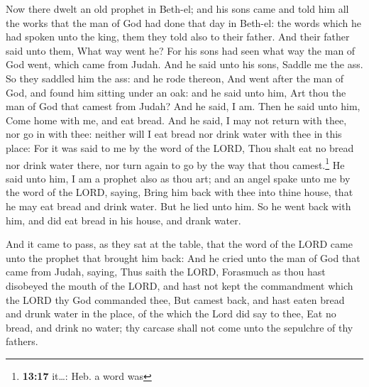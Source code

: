  Now there dwelt an old prophet in Beth-el; and his sons
came and told him all the works that the man of God had done that day in
Beth-el: the words which he had spoken unto the king, them they told
also to their father.  And their father said unto them,
What way went he? For his sons had seen what way the man of God went,
which came from Judah.  And he said unto his sons, Saddle
me the ass. So they saddled him the ass: and he rode thereon,
 And went after the man of God, and found him sitting
under an oak: and he said unto him, Art thou the man of God that camest
from Judah? And he said, I am.  Then he said unto him,
Come home with me, and eat bread.  And he said, I may not
return with thee, nor go in with thee: neither will I eat bread nor
drink water with thee in this place:  For it was said to
me by the word of the LORD, Thou shalt eat no bread nor drink water
there, nor turn again to go by the way that thou camest.\footnote{\textbf{13:17}
  it\ldots: Heb. a word was}  He said unto him, I am a
prophet also as thou art; and an angel spake unto me by the word of the
LORD, saying, Bring him back with thee into thine house, that he may eat
bread and drink water. But he lied unto him.  So he went
back with him, and did eat bread in his house, and drank water.

 And it came to pass, as they sat at the table, that the
word of the LORD came unto the prophet that brought him back:
 And he cried unto the man of God that came from Judah,
saying, Thus saith the LORD, Forasmuch as thou hast disobeyed the mouth
of the LORD, and hast not kept the commandment which the LORD thy God
commanded thee,  But camest back, and hast eaten bread
and drunk water in the place, of the which the Lord did say to thee, Eat
no bread, and drink no water; thy carcase shall not come unto the
sepulchre of thy fathers.

